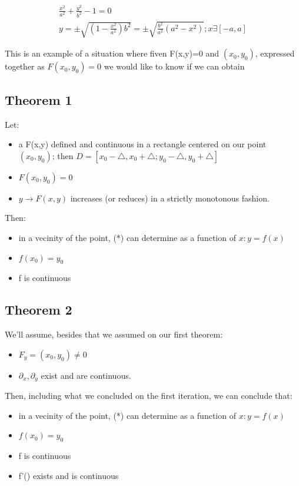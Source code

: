 \documentclass[11pt,fleqn]{book} %
\begin{document}
\begin{example}
\begin{gather}
    \frac{x^2}{a^2} + \frac{y^2}{b^2} - 1 = 0 \\
    y = \pm \sqrt{(1-\frac{x^2}{a^2})b^2} = \pm \sqrt{\frac{b^2}{a^2}(a^2 - x^2)}; x \exists [-a, a]
\end{gather}

This is an example of a situation where fiven F(x,y)=0 and $ (x_0, y_0) $, expressed together
as $F(x_0,y_0)=0$ we would like to know if we can obtain
\end{example}
\subsection{Theorem 1}
Let:

\begin{itemize}
    \item a F(x,y) defined and continuous in a rectangle centered on our point $(x_0, y_0)$; then
    $ D = [x_0 - \triangle, x_0 + \triangle; y_0 - \triangle, y_0 + \triangle] $
    \item $F(x_0, y_0) = 0$
    \item $y \rightarrow F(x,y)$ increases (or reduces) in a strictly monotonous fashion.
\end{itemize}

Then:

\begin{itemize}
    \item in a vecinity of the point, (*) can determine as a function of $x: y = f(x)$
    \item $f(x_0) = y_0$
    \item f is continuous
\end{itemize}

\subsection{Theorem 2}

We'll assume, besides that we assumed on our first theorem:
\begin{itemize}
    \item $F_y = (x_0,y_0) \neq 0$
    \item $\partial_x, \partial_y$ exist and are continuous.
\end{itemize}

Then, including what we concluded on the first iteration, we can conclude that:
\begin{itemize}
    \item in a vecinity of the point, (*) can determine as a function of $x: y = f(x)$
    \item $f(x_0) = y_0$
    \item f is continuous
    \item f'() exists and is continuous
\end{itemize}
\end{document}
